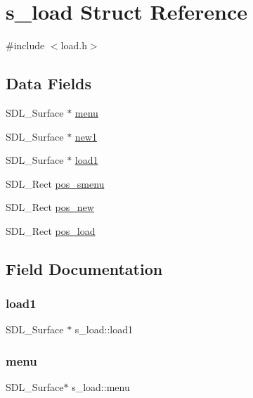 \hypertarget{structs__load}{}\section{s\+\_\+load Struct Reference}
\label{structs__load}


{\ttfamily \#include $<$load.\+h$>$}

\subsection*{Data Fields}
\begin{DoxyCompactItemize}
\item 
S\+D\+L\+\_\+\+Surface $\ast$ \hyperlink{structs__load_ae3f8bf434529b68a3773d90354040c3d}{menu}
\item 
S\+D\+L\+\_\+\+Surface $\ast$ \hyperlink{structs__load_a9ba58ada741b7d909ab635fe47a3e93d}{new1}
\item 
S\+D\+L\+\_\+\+Surface $\ast$ \hyperlink{structs__load_ab0e0c6d78418c4932183a397e28025ad}{load1}
\item 
S\+D\+L\+\_\+\+Rect \hyperlink{structs__load_ab8c7a36251dcdaf992072eccfbd7c868}{pos\+\_\+smenu}
\item 
S\+D\+L\+\_\+\+Rect \hyperlink{structs__load_a9cc546d0039e147179f72ebbefb89a49}{pos\+\_\+new}
\item 
S\+D\+L\+\_\+\+Rect \hyperlink{structs__load_ae94ceaa48f5d724e15d96ccee46b30f5}{pos\+\_\+load}
\end{DoxyCompactItemize}


\subsection{Field Documentation}
\mbox{\label{structs__load_ab0e0c6d78418c4932183a397e28025ad}} 
\subsubsection{\texorpdfstring{load1}{load1}}
{\footnotesize\ttfamily S\+D\+L\+\_\+\+Surface $\ast$ s\+\_\+load\+::load1}

\mbox{\label{structs__load_ae3f8bf434529b68a3773d90354040c3d}} 
\subsubsection{\texorpdfstring{menu}{menu}}
{\footnotesize\ttfamily S\+D\+L\+\_\+\+Surface$\ast$ s\+\_\+load\+::menu}


